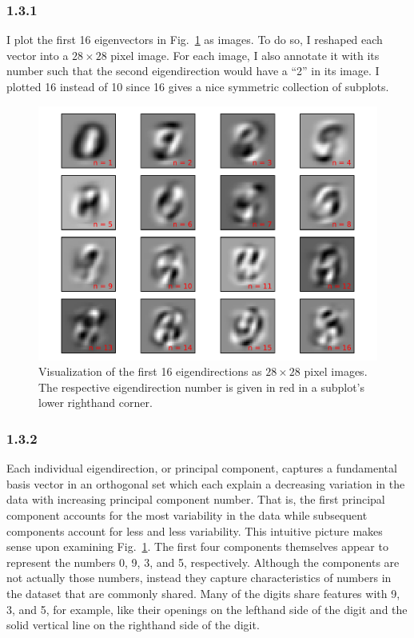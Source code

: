 \documentclass[12pt]{amsart}
\begin{document}
\subsubsection*{1.3.1}
I plot the first 16 eigenvectors in Fig.~\ref{fig:eigendirections} as images.  To do so, I reshaped each vector into a $28 \times 28$ pixel image.  For each image, I also annotate it with its number such that the second eigendirection would have a ``2'' in its image.  I plotted 16 instead of 10 since 16 gives a nice symmetric collection of subplots.
\begin{figure}[H]
	\includegraphics[width=\columnwidth]{eigendirections.pdf}
    \caption{Visualization of the first 16 eigendirections as $28 \times 28$ pixel images.  The respective eigendirection number is given in red in a subplot's lower righthand corner.}
    \label{fig:eigendirections}
\end{figure}

\subsubsection*{1.3.2}
Each individual eigendirection, or principal component, captures a fundamental basis vector in an orthogonal set which each explain a decreasing variation in the data with increasing principal component number.  That is, the first principal component accounts for the most variability in the data while subsequent components account for less and less variability.  This intuitive picture makes sense upon examining Fig.~\ref{fig:eigendirections}.  The first four components themselves appear to represent the numbers 0, 9, 3, and 5, respectively.  Although the components are not actually those numbers, instead they capture characteristics of numbers in the dataset that are commonly shared.  Many of the digits share features with 9, 3, and 5, for example, like their openings on the lefthand side of the digit and the solid vertical line on the righthand side of the digit.
\end{document}
